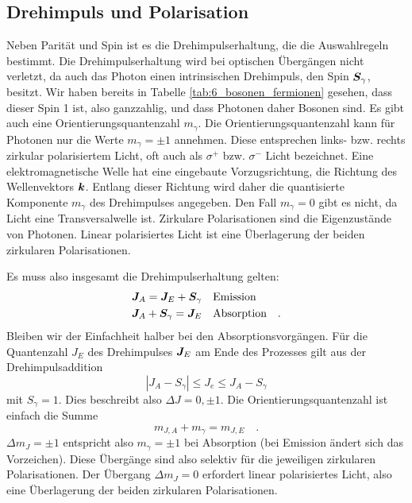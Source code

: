\subsection{Drehimpuls und Polarisation}

Neben Parität und Spin ist es die Drehimpulserhaltung, die die Auswahlregeln bestimmt.
Die Drehimpulserhaltung wird bei optischen Übergängen nicht verletzt, da auch das Photon einen intrinsischen Drehimpuls, den Spin $\boldsymbol{S}_\gamma$, besitzt. Wir haben bereits in Tabelle \ref{tab:6_bosonen_fermionen} gesehen, dass dieser Spin 1 ist, also ganzzahlig, und dass Photonen daher Bosonen sind. Es gibt auch eine Orientierungsquantenzahl $m_\gamma$. Die Orientierungsquantenzahl kann für Photonen nur die Werte $m_\gamma = \pm 1$ annehmen. Diese entsprechen links- bzw. rechts zirkular polarisiertem Licht, oft auch als $\sigma^+$ bzw. $\sigma^-$ Licht bezeichnet. Eine elektromagnetische Welle hat eine eingebaute Vorzugsrichtung, die Richtung des Wellenvektors $\boldsymbol{k}$. Entlang dieser Richtung wird daher die quantisierte Komponente $m_\gamma$ des Drehimpulses angegeben. Den Fall $m_\gamma = 0$ gibt es nicht, da Licht eine Transversalwelle ist. Zirkulare Polarisationen sind die Eigenzustände von Photonen. Linear polarisiertes Licht ist eine Überlagerung der beiden zirkularen Polarisationen.

Es muss also insgesamt die Drehimpulserhaltung gelten:
\begin{align}
    \boldsymbol{J}_A = \boldsymbol{J}_E + \boldsymbol{S}_\gamma  & \quad \text{Emission} \\
    \boldsymbol{J}_A + \boldsymbol{S}_\gamma = \boldsymbol{J}_E & \quad \text{Absorption} \quad .
\end{align}
Bleiben wir der Einfachheit halber bei den Absorptionsvorgängen. Für die Quantenzahl $J_E$ des Drehimpulses $\boldsymbol{J}_E$ am Ende des Prozesses gilt aus der Drehimpulsaddition
\begin{equation}
    | J_A - S_\gamma | \le J_e \le J_A - S_\gamma
\end{equation}
mit $S_\gamma = 1$. Dies beschreibt also $\Delta J = 0, \pm 1$. Die Orientierungsquantenzahl ist einfach die Summe
\begin{equation}
    m_{J,A} + m_\gamma = m_{J,E} \quad .
\end{equation} 
$\Delta m_J = \pm 1$ entspricht also $ m_\gamma = \pm 1$ bei Absorption (bei Emission ändert sich das Vorzeichen). Diese Übergänge sind also selektiv für die jeweiligen zirkularen Polarisationen. Der Übergang $\Delta m_J = 0$ erfordert linear polarisiertes Licht, also eine Überlagerung der beiden zirkularen Polarisationen.


